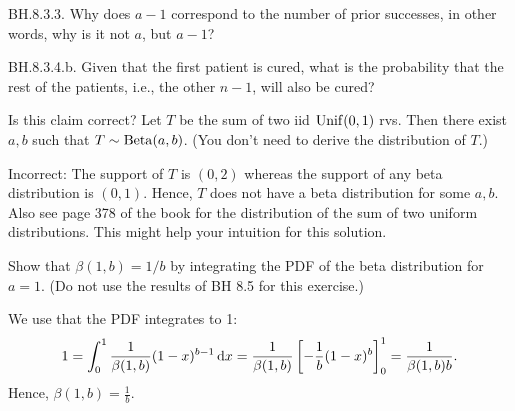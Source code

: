 \begin{exercise}
BH.8.3.3. Why does $a-1$ correspond to  the number of prior successes, in other words, why is it not $a$, but $a-1$?
\begin{hint}
\end{hint}
\begin{solution}
\end{solution}
\end{exercise}

\begin{exercise}
BH.8.3.4.b. Given that the first patient is cured, what is the probability that the rest of the patients, i.e., the other $n-1$, will also be cured?
\begin{hint}
\end{hint}
\begin{solution}
\end{solution}
\end{exercise}


\begin{exercise}
Is this claim correct? Let $T$ be the sum of two iid $\mathrm{Unif}(0,1)$ rvs.
Then there exist $a, b$ such that $T \sim \mathrm{Beta}(a,b)$. (You don't need to derive the distribution of $T$.)
\begin{solution}
Incorrect: The support of $T$ is $(0,2)$ whereas the support of any beta distribution is $(0,1)$. Hence, $T$ does not have a beta distribution for some $a,b$.\\
Also see page 378 of the book for the distribution of the sum of two uniform distributions. This might help your intuition for this solution.
\end{solution}
\end{exercise}

\begin{exercise}
Show that $\beta(1, b) = 1/b$ by integrating the PDF of the beta distribution for $a=1$. (Do not use the results of BH 8.5 for this exercise.)
\begin{solution}
We use that the PDF integrates to 1:
$$1 = \int_0^1 \frac1{\beta(1,b)} (1-x)^{b-1} \,\textrm{d}x =  \frac1{\beta(1,b)}  \left[-\frac{1}{b}(1-x)^{b}\right]_0^1 =  \frac{1}{\beta(1,b) b}.$$
Hence, $\beta(1, b) = \frac1b$.
\end{solution}
\end{exercise}

